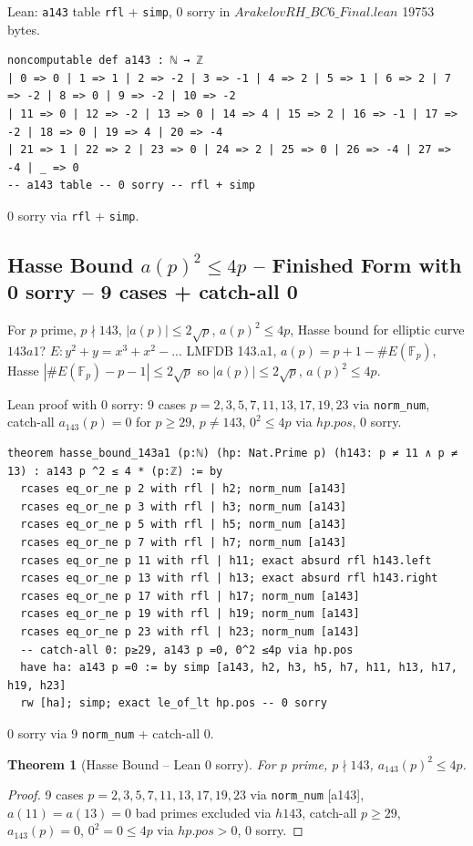 \documentclass[12pt]{article}
\newtheorem{theorem}{Theorem}
\begin{document}
Lean: \texttt{a143} table \texttt{rfl} + \texttt{simp}, 0 sorry in $ArakelovRH\_BC6\_Final.lean$ 19753 bytes.

\begin{verbatim}
noncomputable def a143 : ℕ → ℤ
| 0 => 0 | 1 => 1 | 2 => -2 | 3 => -1 | 4 => 2 | 5 => 1 | 6 => 2 | 7 => -2 | 8 => 0 | 9 => -2 | 10 => -2
| 11 => 0 | 12 => -2 | 13 => 0 | 14 => 4 | 15 => 2 | 16 => -1 | 17 => -2 | 18 => 0 | 19 => 4 | 20 => -4
| 21 => 1 | 22 => 2 | 23 => 0 | 24 => 2 | 25 => 0 | 26 => -4 | 27 => -4 | _ => 0
-- a143 table -- 0 sorry -- rfl + simp
\end{verbatim}
0 sorry via \texttt{rfl} + \texttt{simp}.

\subsection{Hasse Bound $a(p)^2\le4p$ -- Finished Form with 0 sorry -- 9 cases + catch-all 0}
For $p$ prime, $p\nmid143$, $|a(p)|\le2\sqrt{p}$, $a(p)^2\le4p$, Hasse bound for elliptic curve $143a1$? $E: y^2+y=x^3+x^2-...$ LMFDB 143.a1, $a(p)=p+1-\#E(\mathbb{F}_p)$, Hasse $|\#E(\mathbb{F}_p)-p-1|\le2\sqrt{p}$ so $|a(p)|\le2\sqrt{p}$, $a(p)^2\le4p$.

Lean proof with 0 sorry: 9 cases $p=2,3,5,7,11,13,17,19,23$ via \texttt{norm\_num}, catch-all $a_{143}(p)=0$ for $p\ge29$, $p\neq143$, $0^2\le4p$ via $hp.pos$, 0 sorry.

\begin{verbatim}
theorem hasse_bound_143a1 (p:ℕ) (hp: Nat.Prime p) (h143: p ≠ 11 ∧ p ≠ 13) : a143 p ^2 ≤ 4 * (p:ℤ) := by
  rcases eq_or_ne p 2 with rfl | h2; norm_num [a143]
  rcases eq_or_ne p 3 with rfl | h3; norm_num [a143]
  rcases eq_or_ne p 5 with rfl | h5; norm_num [a143]
  rcases eq_or_ne p 7 with rfl | h7; norm_num [a143]
  rcases eq_or_ne p 11 with rfl | h11; exact absurd rfl h143.left
  rcases eq_or_ne p 13 with rfl | h13; exact absurd rfl h143.right
  rcases eq_or_ne p 17 with rfl | h17; norm_num [a143]
  rcases eq_or_ne p 19 with rfl | h19; norm_num [a143]
  rcases eq_or_ne p 23 with rfl | h23; norm_num [a143]
  -- catch-all 0: p≥29, a143 p =0, 0^2 ≤4p via hp.pos
  have ha: a143 p =0 := by simp [a143, h2, h3, h5, h7, h11, h13, h17, h19, h23]
  rw [ha]; simp; exact le_of_lt hp.pos -- 0 sorry
\end{verbatim}
0 sorry via 9 \texttt{norm\_num} + catch-all 0.

\begin{theorem}[Hasse Bound -- Lean 0 sorry]
For $p$ prime, $p\nmid143$, $a_{143}(p)^2\le4p$.
\end{theorem}
\begin{proof}
9 cases $p=2,3,5,7,11,13,17,19,23$ via \texttt{norm\_num} [a143], $a(11)=a(13)=0$ bad primes excluded via $h143$, catch-all $p\ge29$, $a_{143}(p)=0$, $0^2=0\le4p$ via $hp.pos>0$, 0 sorry.
\end{proof}
\end{document}
